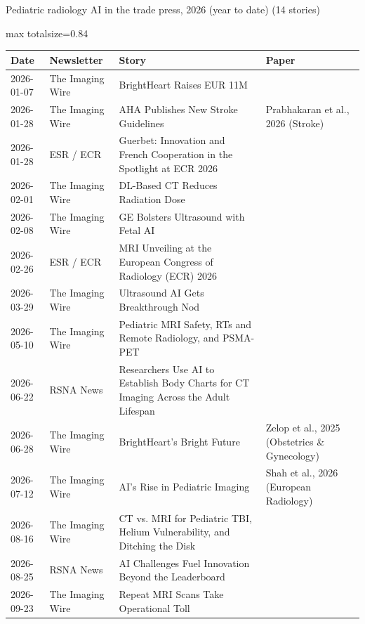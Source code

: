 \documentclass[aspectratio=169]{beamer}
\renewcommand{\arraystretch}{1.08}
\begin{document}
\begin{frame}[category=Newsletters]{Pediatric radiology AI in the trade press, 2026 (year to date) (14 stories)}
\scriptsize
\begin{adjustbox}{max totalsize={\textwidth}{0.84\textheight}}
\renewcommand{\arraystretch}{1.2}
\begin{tabular}{|l|l|>{\raggedright\arraybackslash}p{}|>{\raggedright\arraybackslash}p{}|}
\hline \textbf{Date} & \textbf{Newsletter} & \textbf{Story} & \textbf{Paper} \\ \hline
2026-01-07 & The Imaging Wire & BrightHeart Raises EUR 11M &  \\ \hline
2026-01-28 & The Imaging Wire & AHA Publishes New Stroke Guidelines & Prabhakaran et al., 2026 (Stroke) \\ \hline
2026-01-28 & ESR / ECR & Guerbet: Innovation and French Cooperation in the Spotlight at ECR 2026 &  \\ \hline
2026-02-01 & The Imaging Wire & DL-Based CT Reduces Radiation Dose &  \\ \hline
2026-02-08 & The Imaging Wire & GE Bolsters Ultrasound with Fetal AI &  \\ \hline
2026-02-26 & ESR / ECR & MRI Unveiling at the European Congress of Radiology (ECR) 2026 &  \\ \hline
2026-03-29 & The Imaging Wire & Ultrasound AI Gets Breakthrough Nod &  \\ \hline
2026-05-10 & The Imaging Wire & Pediatric MRI Safety, RTs and Remote Radiology, and PSMA-PET &  \\ \hline
2026-06-22 & RSNA News & Researchers Use AI to Establish Body Charts for CT Imaging Across the Adult Lifespan &  \\ \hline
2026-06-28 & The Imaging Wire & BrightHeart's Bright Future & Zelop et al., 2025 (Obstetrics \& Gynecology) \\ \hline
2026-07-12 & The Imaging Wire & AI's Rise in Pediatric Imaging & Shah et al., 2026 (European Radiology) \\ \hline
2026-08-16 & The Imaging Wire & CT vs. MRI for Pediatric TBI, Helium Vulnerability, and Ditching the Disk &  \\ \hline
2026-08-25 & RSNA News & AI Challenges Fuel Innovation Beyond the Leaderboard &  \\ \hline
2026-09-23 & The Imaging Wire & Repeat MRI Scans Take Operational Toll &  \\ \hline
\end{tabular}
\end{adjustbox}
\end{frame}
\end{document}
